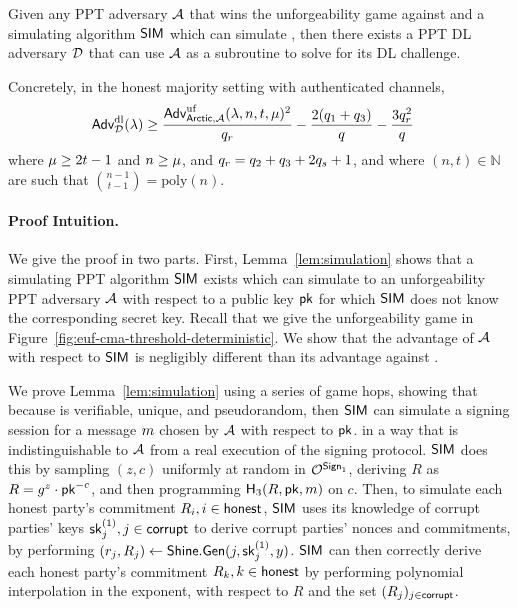 \begin{lemma} \label{lem:reduction}
Given any PPT adversary $\mathcal{A}$ that wins the unforgeability game against \glitter
and a simulating algorithm $\mathsf{SIM}$ which can simulate \glitter,
then there exists a PPT DL adversary $\mathcal{D}$ that can use $\mathcal{A}$ as a subroutine to solve for its DL challenge.

Concretely, in the honest majority setting with authenticated channels,
    \begin{align} \label{eq:ddv-dl-arctic}
    \begin{split}
        \textsf{\upshape Adv}^{\textrm{\upshape dl}}_{\mathcal{D}}(\lambda) & \geq
        \frac{\textsf{\upshape Adv}^{\textrm{\upshape uf}}_{\mathsf{Arctic},\mathcal{A}}(\lambda, n, t, \mu)^2}{q_r}
        - \frac{2(q_1 + q_3)}{q}
        - \frac{3q_r^2}{q}
    \end{split}
    \end{align}
where $\mu \geq 2t-1$ and $n \geq \mu$,
and $q_r = q_2 + q_3 + 2q_s + 1$,
and where $(n, t) \in \mathbb{N}$  are such that ${n-1\choose t-1} = \text{poly}(n)$.
\end{lemma}


\paragraph{\bf Proof Intuition.}
We give the proof in two parts.
First, Lemma~\ref{lem:simulation} shows that a simulating PPT algorithm $\mathsf{SIM}$ exists which can simulate \glitter to an unforgeability PPT adversary $\mathcal{A}$ with respect to a public key  $\mathsf{pk}$ for which $\mathsf{SIM}$ does not know the corresponding secret key.
Recall that we give the unforgeability game in
Figure~\ref{fig:euf-cma-threshold-deterministic}.
We show that the advantage of $\mathcal{A}$ with respect to $\mathsf{SIM}$ is negligibly different than its advantage against \glitter.

We prove Lemma~\ref{lem:simulation} using a series of game hops,
showing that because \DVRFOne is verifiable, unique, and pseudorandom,
then $\mathsf{SIM}$ can simulate a signing session for a message $m$ chosen by $\mathcal{A}$  with respect to $\mathsf{pk}$.
in a way that is indistinguishable to $\mathcal{A}$ from a real execution of the signing protocol.
$\mathsf{SIM}$ does this by sampling $(z,c)$ uniformly at random in $\mathcal{O}^{\mathsf{Sign}_1}$,
deriving $R$ as $R = g^z \cdot \mathsf{pk}^{-c}$,
and then programming $\mathsf{H}_3(R,\mathsf{pk},m)$ on $c$.
Then,
to simulate each honest party's commitment $R_i, i \in \mathsf{honest}$,
$\mathsf{SIM}$ uses its knowledge of corrupt parties' \DVRFOne keys $\mathsf{sk}^{(1)}_j, j \in \mathsf{corrupt}$ to derive corrupt parties' nonces and commitments,
by performing $(r_j, R_j) \gets \mathsf{Shine}.\mathsf{Gen}(j, \mathsf{sk}^{(1)}_j, y)$.
$\mathsf{SIM}$ can then correctly derive each honest party's commitment $R_k, k \in \mathsf{honest}$ by performing polynomial interpolation in the exponent,
with respect to $R$ and the set $(R_j)_{j \in \mathsf{corrupt} }$.

